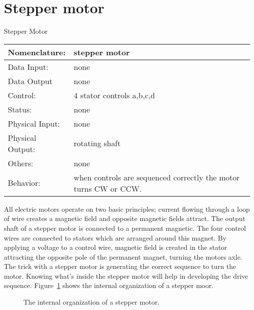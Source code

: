 \section{Stepper motor}
\label{page:stepper}
\begin{buildingblock}{Stepper Motor}
\begin{tabular}{|l|p{3.5in}|} \hline
Nomenclature:  & stepper motor \\ \hline
Data Input:    & none     \\ \hline
Data Output    & none    \\ \hline
Control:       & 4 stator controls a,b,c,d  \\ \hline
Status:        & none                                   \\ \hline
Physical Input:& none		\\ \hline
Physical Output:& rotating shaft \\ \hline
Others:        & none                   \\ \hline
Behavior:      & when controls are sequenced correctly the
motor turns CW or CCW. \\ \hline
\end{tabular}
\end{buildingblock}

All electric motors operate on two basic principles; 
current flowing through a loop of wire creates a magnetic
field and opposite magnetic fields attract.  
The output shaft of a stepper motor is connected to a permanent
magnetic.  The four control wires are connected to stators which
are arranged around this magnet.  By applying a voltage to a 
control wire, magnetic field is created in the stator 
attracting the opposite pole of the permanent magnet, turning 
the motors axle.  The trick with a stepper motor is generating
the correct sequence to turn the motor.  Knowing what's inside
the stepper motor will help in developing the drive sequence.  
Figure~\ref{fig:commonPeripheralComponentsstepper} shows the internal organization of a
stepper moor.

\begin{figure}[ht]
\caption{The internal organization of a stepper motor.}
\label{fig:commonPeripheralComponentsstepper}
\end{figure}

